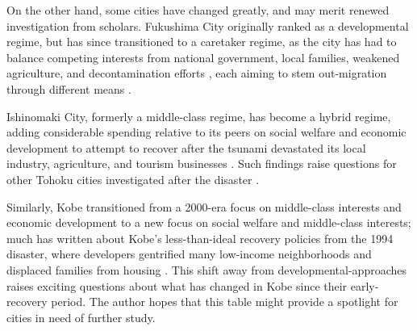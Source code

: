 \documentclass[preprint, 3p,
authoryear]{elsarticle} %
\begin{document}
On the other hand, some cities have changed greatly, and may merit
renewed investigation from scholars. Fukushima City originally ranked as
a developmental regime, but has since transitioned to a caretaker
regime, as the city has had to balance competing interests from national
government, local families, weakened agriculture, and decontamination
efforts \citep{otsuki_2016, abeysinghe_2022}, each aiming to stem
out-migration through different means \citep{zhang_2014}.

Ishinomaki City, formerly a middle-class regime, has become a hybrid
regime, adding considerable spending relative to its peers on social
welfare and economic development to attempt to recover after the tsunami
devastated its local industry, agriculture, and tourism businesses
\citep{dimmer_and_lindenberg_2014, matthews_2017, ji_and_imai_2022}.
Such findings raise questions for other Tohoku cities investigated after
the disaster \citep{aldrich_2019, cheek_2020}.

Similarly, Kobe transitioned from a 2000-era focus on middle-class
interests and economic development \citep{nunokawa_2007, funck_2007} to
a new focus on social welfare and middle-class interests; much has
written about Kobe's less-than-ideal recovery policies from the 1994
disaster, where developers gentrified many low-income neighborhoods and
displaced families from housing
\citep{edgington_2010, aldrich_2012, maly_2012}. This shift away from
developmental-approaches raises exciting questions about what has
changed in Kobe since their early-recovery period. The author hopes that
this table might provide a spotlight for cities in need of further
study.

\renewcommand{\baselinestretch}{0.5}\selectfont
\renewcommand{\arraystretch}{1.5}

\begingroup\fontsize{9}{11}\selectfont
\end{document}
